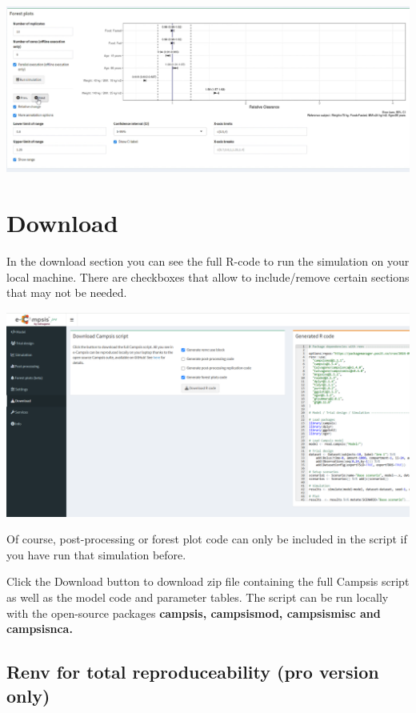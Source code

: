 \documentclass[
]{book}
\begin{document}
\includegraphics{pictures/forest_plot_plot.png}

\chapter{Download}\label{download}

In the download section you can see the full R-code to run the simulation on your local machine. There are checkboxes that allow to include/remove certain sections that may not be needed.

\includegraphics{pictures/Download_section_renv.png}

Of course, post-processing or forest plot code can only be included in the script if you have run that simulation before.

Click the Download button to download zip file containing the full Campsis script as well as the model code and parameter tables. The script can be run locally with the open-source packages \textbf{campsis, campsismod, campsismisc and campsisnca.}

\section{Renv for total reproduceability (pro version only)}\label{renv-for-total-reproduceability-pro-version-only}
\end{document}
